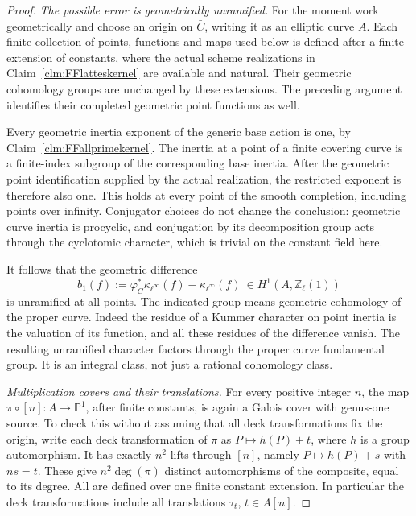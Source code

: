 \documentclass[11pt]{article}
\begin{document}
\begin{proof}
\emph{The possible error is geometrically unramified.}
For the moment work geometrically and choose an
origin on \(\bar C\), writing it as an elliptic
curve \(A\). Each finite collection of points,
functions and maps used below is defined after a
finite extension of constants, where the actual
scheme realizations in
Claim~\ref{clm:FFlatteskernel} are available and
natural. Their geometric cohomology groups are
unchanged by these extensions. The preceding
argument identifies their completed geometric
point functions as well.

Every geometric inertia exponent of the generic
base action is one, by
Claim~\ref{clm:FFallprimekernel}. The inertia at a
point of a finite covering curve is a finite-index
subgroup of the corresponding base inertia. After
the geometric point identification supplied by the
actual realization, the restricted exponent is
therefore also one. This holds at every point of
the smooth completion, including points over
infinity. Conjugator choices do not change the
conclusion: geometric curve inertia is procyclic,
and conjugation by its decomposition group acts
through the cyclotomic character, which is trivial
on the constant field here.

It follows that the geometric difference
\[
 b_1(f):=\varphi_C^*\kappa_{\ell^\infty}(f)
                         -\kappa_{\ell^\infty}(f)
       \ \in H^1(A,\mathbb Z_\ell(1))
                                                        \tag{F.49.4}
\]
is unramified at all points. The indicated group
means geometric cohomology of the proper curve.
Indeed the residue of a Kummer character on point
inertia is the valuation of its function, and all
these residues of the difference vanish. The
resulting unramified character factors through the
proper curve fundamental group. It is an integral
class, not just a rational cohomology class.

\emph{Multiplication covers and their translations.}
For every positive integer \(n\), the map
\(\pi\circ[n]:A\to\mathbb P^1\), after finite
constants, is again a Galois cover with genus-one
source. To check this without assuming that all
deck transformations fix the origin, write each
deck transformation of \(\pi\) as
\(P\mapsto h(P)+t\), where \(h\) is a group
automorphism. It has exactly \(n^2\) lifts through
\([n]\), namely
\(P\mapsto h(P)+s\) with \(ns=t\). These give
\(n^2\deg(\pi)\) distinct automorphisms of the
composite, equal to its degree. All are defined over
one finite constant extension. In particular the
deck transformations include all translations
\(\tau_t\), \(t\in A[n]\).


\end{proof}
\end{document}
